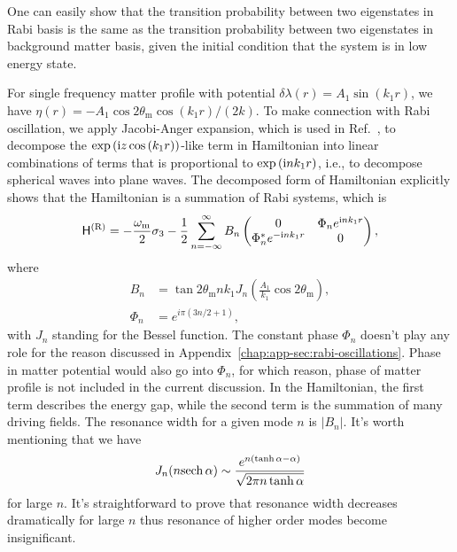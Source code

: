 One can easily show that the transition probability between two eigenstates in Rabi basis is the same as the transition probability between two eigenstates in background matter basis, given the initial condition that the system is in low energy state.

For single frequency matter profile with potential $\delta\lambda(r) = A_1\sin(k_1 r)$, we have $\eta(r) = - A_1 \cos 2\theta_{\mathrm m} \cos (k_1 r)/(2 k) $. To make connection with Rabi oscillation, we apply Jacobi-Anger expansion, which is used in Ref.~\cite{Kneller2013}, to decompose the $\exp\left( \mathrm{i} z \cos\left(k_1 r \right) \right)$-like term in Hamiltonian into linear combinations of terms that is proportional to $\exp\left(\mathrm{i} n k_1 r \right)$, i.e., to decompose spherical waves into plane waves. The decomposed form of Hamiltonian explicitly shows that the Hamiltonian is a summation of Rabi systems, which is
\begin{equation}
    \mathsf H^{(\mathrm{R})} =
    -\frac{\omega_{\mathrm{m}}}{2} \sigma_3
    -  \frac{1}{2} \sum_{n=-\infty}^\infty B_n \begin{pmatrix}
    0 &  \Phi_n e^{\ri n k_1  r} \\
     \Phi_n^* e^{ - \ri n k_1 r} & 0
    \end{pmatrix},
    \label{chap:matter-sec:jacobi-eqn:hamil-jacobi-expanded}
\end{equation}
where
\begin{align}
    B_n &= \tan 2\theta_{\mathrm m} n k_1 J_{n} \left( \frac{A_1}{k_1}\cos 2\theta_{\mathrm m} \right),\\
    \Phi_n &= e^{i\pi (3n/2+1)},
\end{align}
with $J_n$ standing for the Bessel function.
The constant phase $\Phi_n$ doesn't play any role for the reason discussed in Appendix~\ref{chap:app-sec:rabi-oscillations}. Phase in matter potential would also go into $\Phi_n$, for which reason, phase of matter profile is not included in the current discussion. In the Hamiltonian, the first term describes the energy gap, while the second term is the summation of many driving fields. The resonance width for a given mode $n$ is $\lvert B_{n}\rvert$. It's worth mentioning that we have~\cite{Ploumistakis20092897}
\begin{equation}
J_n(n {\operatorname{sech}{\alpha}}) \sim \frac{ e^{n(\tanh\alpha - \alpha)} }{\sqrt{ 2\pi n \tanh \alpha } }
\end{equation}
for large $n$. It's straightforward to prove that resonance width decreases dramatically for large $n$ thus resonance of higher order modes become insignificant.



